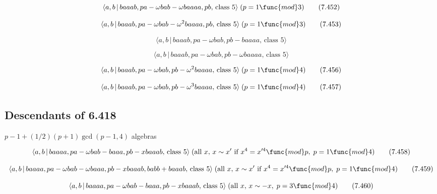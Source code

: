 \documentclass[10pt]{article}
\begin{document}
\begin{equation}
\langle a,b\,|\,baaab,pa-\omega bab-\omega baaaa,pb,\,\text{class }5\rangle
\;(p=1\func{mod}3)  \tag{7.452}
\end{equation}

\begin{equation}
\langle a,b\,|\,baaab,pa-\omega bab-\omega ^{2}baaaa,pb,\,\text{class }%
5\rangle \;(p=1\func{mod}3)  \tag{7.453}
\end{equation}

\begin{equation}
\langle a,b\,|\,baaab,pa-\omega bab,pb-baaaa,\,\text{class }5\rangle 
\tag{7.454}
\end{equation}

\begin{equation}
\langle a,b\,|\,baaab,pa-\omega bab,pb-\omega baaaa,\,\text{class }5\rangle 
\tag{7.455}
\end{equation}

\begin{equation}
\langle a,b\,|\,baaab,pa-\omega bab,pb-\omega ^{2}baaaa,\,\text{class }%
5\rangle \;(p=1\func{mod}4)  \tag{7.456}
\end{equation}

\begin{equation}
\langle a,b\,|\,baaab,pa-\omega bab,pb-\omega ^{3}baaaa,\,\text{class }%
5\rangle \;(p=1\func{mod}4)  \tag{7.457}
\end{equation}

\subsection{Descendants of 6.418}

$p-1+(1/2)(p+1)\gcd (p-1,4)$ algebras

\begin{equation}
\langle a,b\,|\,baaaa,pa-\omega bab-baaa,pb-xbaaab,\,\text{class }5\rangle
\;(\text{all }x,\,x\sim x^{\prime}\text{ if }x^4=x^{\prime 4}\func{mod}%
p,\;p=1\func{mod}4)  \tag{7.458}
\end{equation}

\begin{equation}
\langle a,b\,|\,baaaa,pa-\omega bab-\omega baaa,pb-xbaaab,babb+baaab,\,\text{%
class }5\rangle \;(\text{all }x,\,x\sim x^{\prime}\text{ if }x^4=x^{\prime 4}%
\func{mod}p,\;p=1\func{mod}4)  \tag{7.459}
\end{equation}

\begin{equation}
\langle a,b\,|\,baaaa,pa-\omega bab-baaa,pb-xbaaab,\,\text{class }5\rangle
\;(\text{all }x,\,x\sim -x,\;p=3\func{mod}4)  \tag{7.460}
\end{equation}
\end{document}
